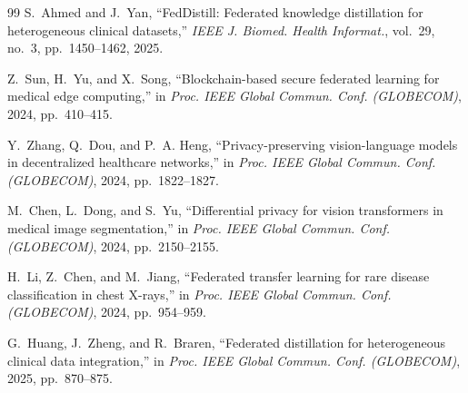 \documentclass[letterpaper, conference]{IEEEtran}
\begin{document}
\begin{thebibliography}{99}
S.~Ahmed and J.~Yan, ``FedDistill: Federated knowledge distillation for
heterogeneous clinical datasets,'' \emph{IEEE J. Biomed. Health Informat.},
vol.~29, no.~3, pp.~1450--1462, 2025.

Z.~Sun, H.~Yu, and X.~Song, ``Blockchain-based secure federated learning for
medical edge computing,'' in \emph{Proc. IEEE Global Commun. Conf. (GLOBECOM)},
2024, pp.~410--415.

Y.~Zhang, Q.~Dou, and P.~A. Heng, ``Privacy-preserving vision-language models in
decentralized healthcare networks,'' in \emph{Proc. IEEE Global Commun. Conf.
(GLOBECOM)}, 2024, pp.~1822--1827.

M.~Chen, L.~Dong, and S.~Yu, ``Differential privacy for vision transformers in
medical image segmentation,'' in \emph{Proc. IEEE Global Commun. Conf.
(GLOBECOM)}, 2024, pp.~2150--2155.

H.~Li, Z.~Chen, and M.~Jiang, ``Federated transfer learning for rare disease
classification in chest X-rays,'' in \emph{Proc. IEEE Global Commun. Conf.
(GLOBECOM)}, 2024, pp.~954--959.

G.~Huang, J.~Zheng, and R.~Braren, ``Federated distillation for heterogeneous
clinical data integration,'' in \emph{Proc. IEEE Global Commun. Conf. (GLOBECOM)},
2025, pp.~870--875.

\end{thebibliography}
\end{document}
